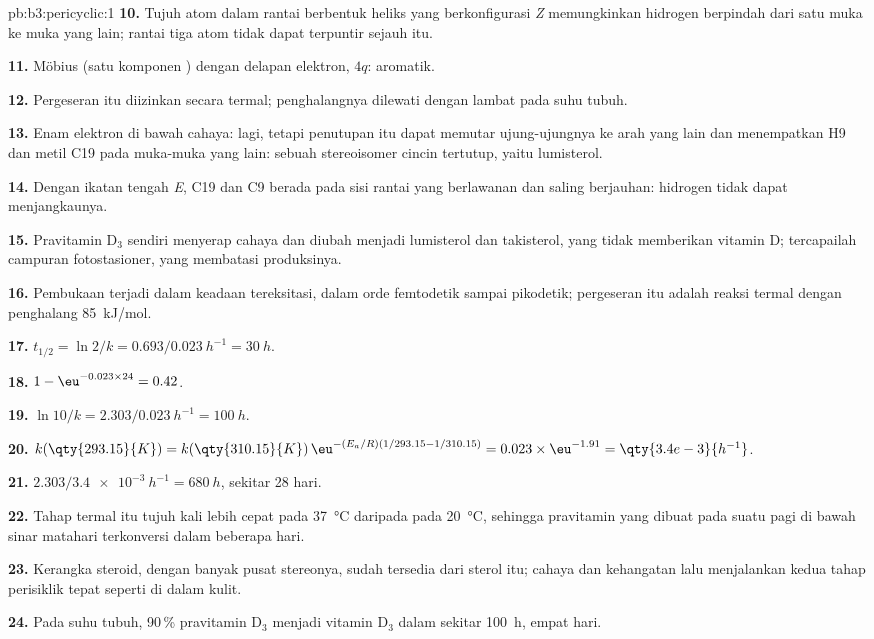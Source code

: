 \begin{solution}{pb:b3:pericyclic:1}
\textbf{10.} Tujuh atom dalam rantai berbentuk heliks yang berkonfigurasi \textit{Z} memungkinkan hidrogen berpindah dari satu muka ke
muka yang lain; rantai tiga atom tidak dapat terpuntir sejauh itu.

\textbf{11.} Möbius (satu komponen ) dengan delapan elektron, $4q$: aromatik.

\textbf{12.} Pergeseran itu diizinkan secara termal; penghalangnya dilewati dengan lambat pada suhu tubuh.

\textbf{13.} Enam elektron di bawah cahaya:  lagi, tetapi penutupan itu dapat memutar ujung-ujungnya ke
arah yang lain dan menempatkan H9 dan metil C19 pada muka-muka yang lain: sebuah stereoisomer
cincin tertutup, yaitu lumisterol.

\textbf{14.} Dengan ikatan tengah \textit{E}, C19 dan C9 berada pada sisi rantai yang berlawanan dan saling
berjauhan: hidrogen tidak dapat menjangkaunya.

\textbf{15.} Pravitamin D$_3$ sendiri menyerap cahaya dan diubah menjadi lumisterol dan takisterol,
yang tidak memberikan vitamin D; tercapailah campuran fotostasioner, yang membatasi
produksinya.

\textbf{16.} Pembukaan terjadi dalam keadaan tereksitasi, dalam orde femtodetik sampai pikodetik;
pergeseran itu adalah reaksi termal dengan penghalang \qty{85}{kJ/mol}.

\textbf{17.} $t_{1/2} = \ln 2/k = 0.693/\qty{0.023}{h^{-1}} = \qty{30}{h}$.

\textbf{18.} $1 - \eu^{-0.023 \times 24} = 0.42$.

\textbf{19.} $\ln 10/k = 2.303/\qty{0.023}{h^{-1}} = \qty{100}{h}$.

\textbf{20.} $k(\qty{293.15}{K}) = k(\qty{310.15}{K})\,\eu^{-(E_a/R)(1/293.15 - 1/310.15)} = 0.023 \times \eu^{-1.91} = \qty{3.4e-3}{h^{-1}}$.

\textbf{21.} $2.303/\qty{3.4e-3}{h^{-1}} = \qty{680}{h}$, sekitar 28 hari.

\textbf{22.} Tahap termal itu tujuh kali lebih cepat pada \qty{37}{\celsius} daripada pada \qty{20}{\celsius}, sehingga
pravitamin yang dibuat pada suatu pagi di bawah sinar matahari terkonversi dalam beberapa hari.

\textbf{23.} Kerangka steroid, dengan banyak pusat stereonya, sudah tersedia dari
sterol itu; cahaya dan kehangatan lalu menjalankan kedua tahap perisiklik tepat seperti di dalam
kulit.

\textbf{24.} Pada suhu tubuh, 90\,\% pravitamin D$_3$ menjadi vitamin D$_3$ dalam sekitar
\qty{100}{h}, empat hari.
\end{solution}
